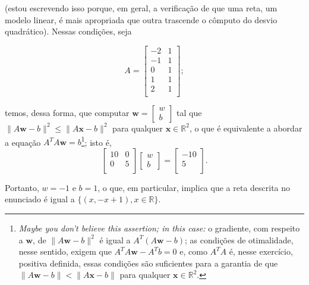 \documentclass[leqno]{article}
\begin{document}
\begin{enumerate}
\begin{sol}
	\noindent (estou escrevendo isso porque, em geral, a verificação de que uma reta, um modelo linear, é mais apropriada que outra trascende o cômputo do desvio quadrático). Nessas condições, seja 

	\begin{equation*} 
		A = 
		\begin{bmatrix} 
			-2 & 1 \\ 
			-1 & 1 \\ 
			0 & 1 \\ 
			1 & 1 \\ 
			2 & 1 \\ 
		\end{bmatrix};   
	\end{equation*} 

	\noindent temos, dessa forma, que computar $\mathbf{w} = \begin{bmatrix} w \\ b \end{bmatrix}$ tal que $\|A\mathbf{w} - b\|^{2} \le \|A\mathbf{x} - b\|^{2}$ para qualquer $\mathbf{x} \in \mathbb{R}^{2}$, o que é equivalente a abordar a equação $A^{T}A\mathbf{w} = b$\footnote{\textit{Maybe you don't believe this assertion; in this case:} o gradiente, com respeito a $\mathbf{w}$, de $\|A\mathbf{w} - b\|^{2}$ é igual a $A^{T}(A\mathbf{w} - b)$; as condições de otimalidade, nesse sentido, exigem que $A^{T}A\mathbf{w} - A^{T}b = 0$ e, como $A^{T}A$ é, nesse exercício, positiva definida, essas condições são suficientes para a garantia de que $\|A\mathbf{w} - b\| < \|A\mathbf{x} - b\|$ para qualquer $\mathbf{x} \in \mathbb{R}^{2}$.}; isto é, 
	\begin{equation*} 
		\begin{bmatrix} 
			10 & 0 \\ 
			0 & 5 \\ 
		\end{bmatrix} 
		\begin{bmatrix} 
			w \\ 
			b 
		\end{bmatrix} = 
		\begin{bmatrix} 
			-10 \\ 
			5 \\ 
		\end{bmatrix}.  
	\end{equation*} 

	\noindent Portanto, $w = -1$ e $b = 1$, o que, em particular, implica que a reta descrita no enunciado é igual a $\{(x, -x + 1), x \in \mathbb{R}\}$. 


\end{sol}
\end{enumerate}
\end{document}
